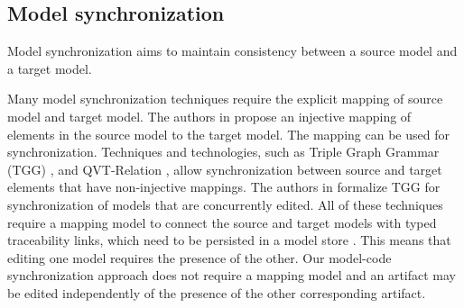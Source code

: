 %
%

\subsection{Model synchronization}

Model synchronization aims
to maintain consistency between a source model and a target model. 

Many model synchronization techniques require the explicit mapping of source model and target model.
The authors in \cite{Paesschen2005} propose an injective mapping of elements in the source model to
the target model. The mapping can be used for synchronization.
Techniques and technologies, such as Triple Graph Grammar (TGG) \cite{giese_incremental_2006},
and QVT-Relation \cite{Omg2008},
allow synchronization between source and target elements that have non-injective mappings.
The authors in \cite{Hermann2012} formalize TGG for synchronization of models that are concurrently edited.
All of these techniques require a mapping model to connect the source and target models
with typed traceability links, which need to be persisted in a model store \cite{Bergmann2011}.
This means that editing one model requires the presence of the other.
Our model-code synchronization approach does not require a mapping model and an artifact may be edited
independently of the presence of the other corresponding artifact.

